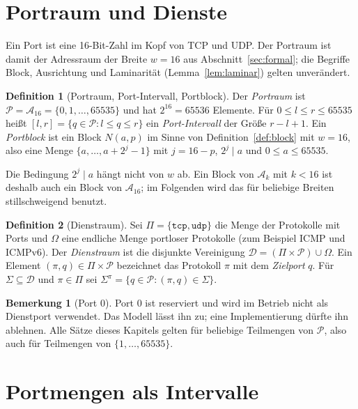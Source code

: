 \documentclass[a4paper,12pt, twoside]{report}
\theoremstyle{definition}
\newtheorem{definition}{Definition}
\newtheorem{bemerkung}{Bemerkung}
\begin{document}
\section{Portraum und Dienste}

Ein Port ist eine 16-Bit-Zahl im Kopf von TCP und UDP. Der Portraum ist damit der Adressraum der Breite $w=16$ aus Abschnitt~\ref{sec:formal}; die Begriffe Block, Ausrichtung und Laminarität (Lemma~\ref{lem:laminar}) gelten unverändert.

\begin{definition}[Portraum, Port-Intervall, Portblock]
\label{def:portraum}
	Der \emph{Portraum} ist $\mathcal{P} = \mathcal{A}_{16} = \{0,1,\ldots,65535\}$ und hat $2^{16} = 65536$ Elemente. Für $0 \le l \le r \le 65535$ heißt $[l,r] = \{q \in \mathcal{P} : l \le q \le r\}$ ein \emph{Port-Intervall} der Größe $r-l+1$. Ein \emph{Portblock} ist ein Block $N(a,p)$ im Sinne von Definition~\ref{def:block} mit $w=16$, also eine Menge $\{a,\ldots,a+2^j-1\}$ mit $j = 16-p$, $2^j \mid a$ und $0 \le a \le 65535$.
\end{definition}

Die Bedingung $2^j \mid a$ hängt nicht von $w$ ab. Ein Block von $\mathcal{A}_k$ mit $k<16$ ist deshalb auch ein Block von $\mathcal{A}_{16}$; im Folgenden wird das für beliebige Breiten stillschweigend benutzt.

\begin{definition}[Dienstraum]
\label{def:dienst}
	Sei $\Pi = \{\texttt{tcp},\texttt{udp}\}$ die Menge der Protokolle mit Ports und $\Omega$ eine endliche Menge portloser Protokolle (zum Beispiel ICMP und ICMPv6). Der \emph{Dienstraum} ist die disjunkte Vereinigung $\mathcal{D} = (\Pi \times \mathcal{P}) \cup \Omega$. Ein Element $(\pi,q) \in \Pi\times\mathcal{P}$ bezeichnet das Protokoll $\pi$ mit dem \emph{Zielport} $q$. Für $\Sigma \subseteq \mathcal{D}$ und $\pi\in\Pi$ sei $\Sigma^\pi = \{q \in \mathcal{P} : (\pi,q)\in\Sigma\}$.
\end{definition}

\begin{bemerkung}[Port 0]
	Port $0$ ist reserviert und wird im Betrieb nicht als Dienstport verwendet. Das Modell lässt ihn zu; eine Implementierung dürfte ihn ablehnen. Alle Sätze dieses Kapitels gelten für beliebige Teilmengen von $\mathcal{P}$, also auch für Teilmengen von $\{1,\ldots,65535\}$.
\end{bemerkung}

\section{Portmengen als Intervalle}
\end{document}
